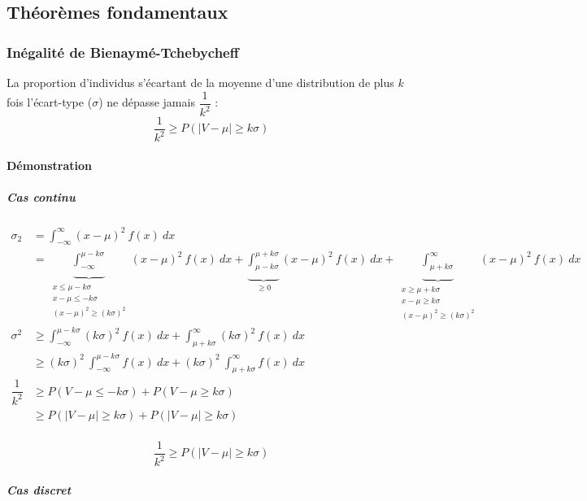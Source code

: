 \newpage
\subsection{Théorèmes fondamentaux}






\subsubsection{Inégalité de Bienaymé-Tchebycheff}
La proportion d'individus s'écartant de la moyenne d'une distribution de plus $k$ fois l'écart-type ($\sigma$) ne dépasse jamais $\dfrac{1}{k^2}$ :
$$\boxed{\dfrac{1}{k^2} \geq P(|V-\mu|\geq k\sigma)}$$
\paragraph{Démonstration}
\subparagraph{Cas continu}
\begin{center}
	$\begin{array}{LL}
		\sigma_2       &= \int_{-\infty}^{\infty} (x-\mu)^2\ f(x)\ dx\\
			     &= \underbrace{\int_{-\infty}^{\mu-k\sigma}}_{\substack{x\leq\mu-k\sigma\\x-\mu\leq -k\sigma\\(x-\mu)^2\geq(k\sigma)^2}}
		         (x-\mu)^2\ f(x)\ dx + \underbrace{\int_{\mu-k\sigma}^{\mu+k\sigma}}_{\geq0} (x-\mu)^2\ f(x)\ dx + \underbrace{\int_{\mu+k\sigma}^{\infty}}_{\substack{x\geq\mu+k\sigma\\x-\mu\geq k\sigma\\(x-\mu)^2\geq(k\sigma)^2}} (x-\mu)^2\ f(x)\ dx\\
		\sigma^2       &\geq \int_{-\infty}^{\mu-k\sigma} (k\sigma)^2\ f(x)\ dx + \int_{\mu+k\sigma}^{\infty} (k\sigma)^2\ f(x)\ dx\\
			     &\geq (k\sigma)^2\ \int_{-\infty}^{\mu-k\sigma} f(x)\ dx + (k\sigma)^2\ \int_{\mu+k\sigma}^{\infty} f(x)\ dx\\
		\dfrac{1}{k^2} &\geq P( V - \mu \leq-k\sigma) + P( V - \mu \geq k\sigma)\\
			     &\geq P(|V-\mu|\geq k\sigma) + P(|V-\mu|\geq k\sigma)\\
	\end{array}$
\end{center}
$$\boxed{\dfrac{1}{k^2} \geq P(|V-\mu|\geq k\sigma)}$$
\subparagraph{Cas discret}
